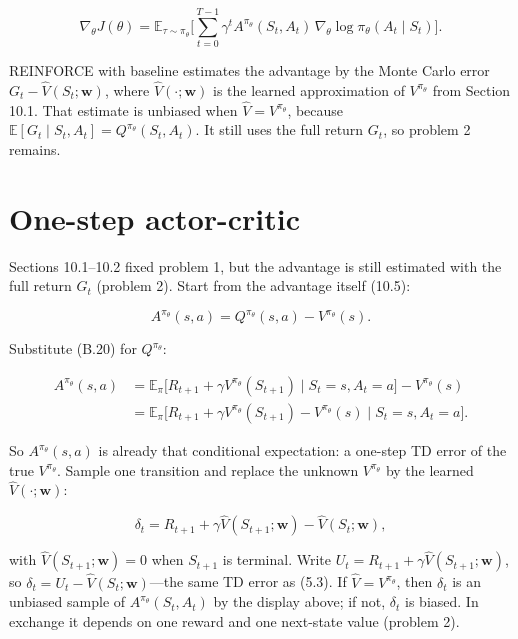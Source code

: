 \begin{equation}
\nabla_\theta J(\theta)
=
\mathbb{E}_{\tau\sim\pi_\theta}\Biggl[
\sum_{t=0}^{T-1}
\gamma^{t}A^{\pi_\theta}(S_t,A_t)\,\nabla_\theta\log\pi_\theta(A_t\mid S_t)
\Biggr].
\tag{10.6}
\end{equation}

REINFORCE with baseline estimates the advantage by the Monte Carlo error $G_t-\hat{V}(S_t;\mathbf{w})$, where $\hat{V}(\cdot;\mathbf{w})$ is the learned approximation of $V^{\pi_\theta}$ from Section 10.1. That estimate is unbiased when $\hat{V}=V^{\pi_\theta}$, because $\mathbb{E}[G_t\mid S_t,A_t]=Q^{\pi_\theta}(S_t,A_t)$. It still uses the full return $G_t$, so problem 2 remains.

\section{One-step actor-critic}

Sections 10.1--10.2 fixed problem 1, but the advantage is still estimated with the full return $G_t$ (problem 2). Start from the advantage itself (10.5):

\[
A^{\pi_\theta}(s,a)
=
Q^{\pi_\theta}(s,a)-V^{\pi_\theta}(s).
\]

Substitute (B.20) for $Q^{\pi_\theta}$:

\[
\begin{aligned}
A^{\pi_\theta}(s,a)
&=
\mathbb{E}_\pi\bigl[R_{t+1}+\gamma V^{\pi_\theta}(S_{t+1})\mid S_t=s,A_t=a\bigr]
-
V^{\pi_\theta}(s)
\\
&=
\mathbb{E}_\pi\bigl[R_{t+1}+\gamma V^{\pi_\theta}(S_{t+1})-V^{\pi_\theta}(s)\mid S_t=s,A_t=a\bigr].
\end{aligned}
\]

So $A^{\pi_\theta}(s,a)$ is already that conditional expectation: a one-step TD error of the true $V^{\pi_\theta}$. Sample one transition and replace the unknown $V^{\pi_\theta}$ by the learned $\hat{V}(\cdot;\mathbf{w})$:

\begin{equation}
\delta_t
=
R_{t+1}+\gamma\hat{V}(S_{t+1};\mathbf{w})-\hat{V}(S_t;\mathbf{w}),
\tag{10.7}
\end{equation}

with $\hat{V}(S_{t+1};\mathbf{w})=0$ when $S_{t+1}$ is terminal. Write $U_t=R_{t+1}+\gamma\hat{V}(S_{t+1};\mathbf{w})$, so $\delta_t=U_t-\hat{V}(S_t;\mathbf{w})$---the same TD error as (5.3). If $\hat{V}=V^{\pi_\theta}$, then $\delta_t$ is an unbiased sample of $A^{\pi_\theta}(S_t,A_t)$ by the display above; if not, $\delta_t$ is biased. In exchange it depends on one reward and one next-state value (problem 2).

